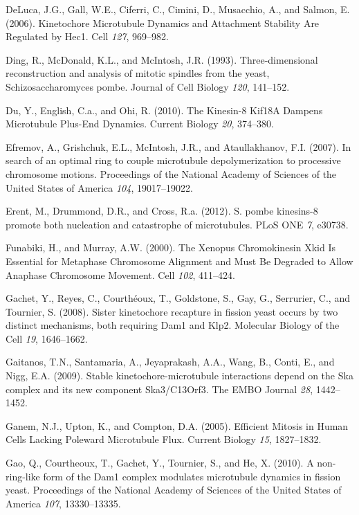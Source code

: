 \documentclass[12pt,a4paper,twoside,openright]{book}
\begin{document}
\hypertarget{ref-DeLuca2006}{}
DeLuca, J.G., Gall, W.E., Ciferri, C., Cimini, D., Musacchio, A., and
Salmon, E. (2006). Kinetochore Microtubule Dynamics and Attachment
Stability Are Regulated by Hec1. Cell \emph{127}, 969--982.

\hypertarget{ref-Ding1993a}{}
Ding, R., McDonald, K.L., and McIntosh, J.R. (1993). Three-dimensional
reconstruction and analysis of mitotic spindles from the yeast,
Schizosaccharomyces pombe. Journal of Cell Biology \emph{120}, 141--152.

\hypertarget{ref-Du2010}{}
Du, Y., English, C.a., and Ohi, R. (2010). The Kinesin-8 Kif18A Dampens
Microtubule Plus-End Dynamics. Current Biology \emph{20}, 374--380.

\hypertarget{ref-Efremov2007}{}
Efremov, A., Grishchuk, E.L., McIntosh, J.R., and Ataullakhanov, F.I.
(2007). In search of an optimal ring to couple microtubule
depolymerization to processive chromosome motions. Proceedings of the
National Academy of Sciences of the United States of America \emph{104},
19017--19022.

\hypertarget{ref-Erent2012}{}
Erent, M., Drummond, D.R., and Cross, R.a. (2012). S. pombe kinesins-8
promote both nucleation and catastrophe of microtubules. PLoS ONE
\emph{7}, e30738.

\hypertarget{ref-Funabiki2000}{}
Funabiki, H., and Murray, A.W. (2000). The Xenopus Chromokinesin Xkid Is
Essential for Metaphase Chromosome Alignment and Must Be Degraded to
Allow Anaphase Chromosome Movement. Cell \emph{102}, 411--424.

\hypertarget{ref-Gachet2008a}{}
Gachet, Y., Reyes, C., Courthéoux, T., Goldstone, S., Gay, G.,
Serrurier, C., and Tournier, S. (2008). Sister kinetochore recapture in
fission yeast occurs by two distinct mechanisms, both requiring Dam1 and
Klp2. Molecular Biology of the Cell \emph{19}, 1646--1662.

\hypertarget{ref-Gaitanos2009}{}
Gaitanos, T.N., Santamaria, A., Jeyaprakash, A.A., Wang, B., Conti, E.,
and Nigg, E.A. (2009). Stable kinetochore-microtubule interactions
depend on the Ska complex and its new component Ska3/C13Orf3. The EMBO
Journal \emph{28}, 1442--1452.

\hypertarget{ref-Ganem2005}{}
Ganem, N.J., Upton, K., and Compton, D.A. (2005). Efficient Mitosis in
Human Cells Lacking Poleward Microtubule Flux. Current Biology
\emph{15}, 1827--1832.

\hypertarget{ref-Gao2010}{}
Gao, Q., Courtheoux, T., Gachet, Y., Tournier, S., and He, X. (2010). A
non-ring-like form of the Dam1 complex modulates microtubule dynamics in
fission yeast. Proceedings of the National Academy of Sciences of the
United States of America \emph{107}, 13330--13335.
\end{document}
